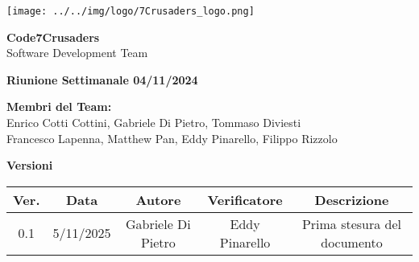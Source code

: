 \documentclass{article}
\begin{document}
\begin{titlepage}


    \centering
    \vspace*{2cm}
    
    \texttt{[image: ../../img/logo/7Crusaders\_logo.png]} %
    \vspace{1cm}
    
    {\Huge \textbf{Code7Crusaders}}\\
    \vspace{0.5cm}
    {\Large Software Development Team}\\
    \vspace{2cm}
    
    {\large \textbf{Riunione Settimanale 04/11/2024}}\\
    \vspace{5cm}

    \textbf{Membri del Team:}\\
    Enrico Cotti Cottini, Gabriele Di Pietro, Tommaso Diviesti \\
    Francesco Lapenna, Matthew Pan, Eddy Pinarello, Filippo Rizzolo \\
    \vspace{0.5cm}
    
    \vspace{1cm}
\end{titlepage}

\newpage
\begin{table}[h!]
\centering
\textbf{Versioni} \\ %
\vspace{2mm} %
\begin{tabular}{|c|c|c|c|c|}
    \hline
    \textbf{Ver.} & \textbf{Data} & \textbf{Autore} & \textbf{Verificatore} & \textbf{Descrizione} \\
    \hline
    0.1 & 5/11/2025 & Gabriele Di Pietro & Eddy Pinarello & Prima stesura del documento \\ 
    \hline
\end{tabular}
\end{table}
\end{document}
